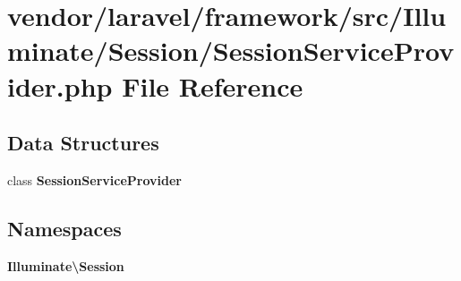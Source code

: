 \section{vendor/laravel/framework/src/\+Illuminate/\+Session/\+Session\+Service\+Provider.php File Reference}
\label{_session_service_provider_8php}
\subsection*{Data Structures}
\begin{DoxyCompactItemize}
\item 
class {\bf Session\+Service\+Provider}
\end{DoxyCompactItemize}
\subsection*{Namespaces}
\begin{DoxyCompactItemize}
\item 
 {\bf Illuminate\textbackslash{}\+Session}
\end{DoxyCompactItemize}

